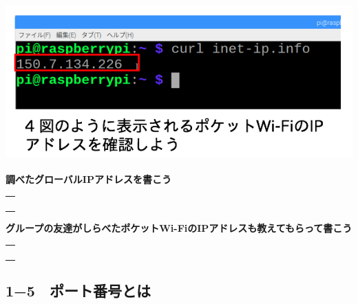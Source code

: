 \documentclass[a4paper,12pt,dvipdfmx]{jarticle}
\begin{document}
\centering
\includegraphics[width=13.85cm,height=6.052cm]{ome7-img019.png}
\flushleft


\bigskip


\bigskip

{\bfseries
調べたグローバルIPアドレスを書こう}


\bigskip


\centering
\begin{tabular}{|p{}|} \hline
	\\
	\\
	\\
	\\ \hline
\end{tabular}


\flushleft




\bigskip


\bigskip

{\bfseries
グループの友達がしらべたポケットWi-FiのIPアドレスも教えてもらって書こう}



\bigskip


\centering
\begin{tabular}{|p{}|} \hline
	\\
	\\
	\\
	\\ \hline
\end{tabular}


\flushleft



\bigskip


\bigskip

\clearpage\subsection*{1−5　ポート番号とは}
\end{document}
